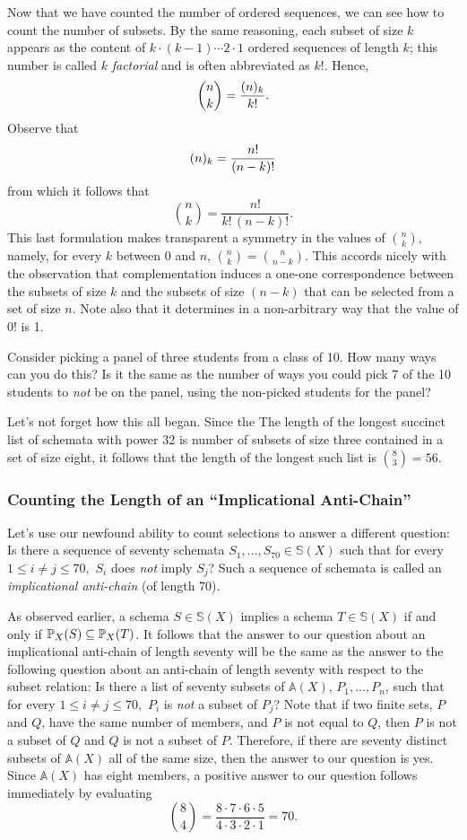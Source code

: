 Now that we have counted the number of ordered sequences, we can see how to count the number of subsets. By the same reasoning, each subset of size $k$ appears as the content of $k\cdot(k-1)\cdots2\cdot1$ ordered sequences of length $k$; this number is called $k$ \emph{factorial} and is often abbreviated as $k!$. Hence, 
\[\binom{n}{k} = \frac{\oc{n}{k}}{k!}.\]  
Observe that 
\[\oc{n}{k}=\frac{n!}{(n-k)!}\]
from which it follows that 
\[\binom{n}{k} = \frac{n!}{k!\,(n-k)!}.\]
This last formulation makes transparent a symmetry in the values of $\binom{n}{k}$, namely, for every $k$ between $0$ and $n$, $\binom{n}{k}=\binom{n}{n-k}$. This accords nicely with the observation that complementation induces a one-one correspondence between the subsets of size $k$ and the subsets of size $(n-k)$ that can be selected from a set of size $n$. Note also that it determines in a non-arbitrary way that the value of $0!$ is 1.

\begin{aside}
    Consider picking a panel of three students from a class of 10. How many ways can you do this? Is it the same as the number of ways you could pick 7 of the 10 students to \emph{not} be on the panel, using the non-picked students for the panel?
\end{aside}

Let's not forget how this all began. Since the The length of the longest succinct list of schemata with power 32 is number of subsets of size three contained in a set of size eight, it follows that the length of the longest such list is $\binom{8}{3}=56$.

\subsubsection*{Counting the Length of an ``Implicational Anti-Chain''}
Let's use our newfound ability to count selections to answer a different question: Is there a sequence of seventy schemata $S_1,\ldots,S_{70}\in\mathbb{S}(X)$ such that for every $1\leq i\neq j\leq 70,$ $S_i$ does \emph{not} imply $S_j$? Such a sequence of schemata is called an \emph{implicational anti-chain} (of length 70).

As observed earlier, a schema $S\in\mathbb{S}(X)$ implies a schema $T\in\mathbb{S}(X)$ if and only if $\prop{S}{X}\subseteq\prop{T}{X}$. It follows that the answer to our question about an implicational anti-chain of length seventy will be the same as the answer to the following question about an anti-chain of length seventy with respect to the subset relation: Is there a list of seventy subsets of $\mathbb{A}(X)$, $P_1,\ldots,P_n$, such that for every $1\leq i\neq j\leq 70,$ $P_i$ is \emph{not} a subset of $P_j$? Note that if two finite sets, $P$ and $Q$, have the same number of members, and $P$ is not equal to $Q$, then $P$ is not a subset of $Q$ and $Q$ is not a subset of $P$. Therefore, if there are seventy distinct subsets of $\mathbb{A}(X)$ all of the same size, then the answer to our question is yes. Since $\mathbb{A}(X)$ has eight members, a positive answer to our question follows immediately by evaluating 
\[
\binom{8}{4}= \frac{8\cdot7\cdot6\cdot5}{4\cdot3\cdot2\cdot1}=70.
\] 

